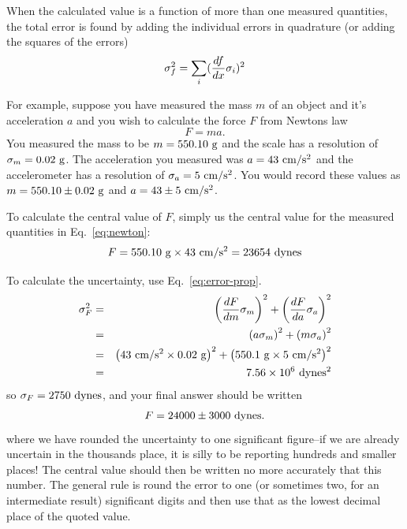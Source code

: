 \documentclass{article}
\begin{document}
When the calculated value is a function of more than one measured quantities, the total error is found by adding the individual errors in quadrature (or adding the squares of the errors)
\begin{equation}
\sigma_f^2 = \sum_i ({df \over dx} \sigma_i)^2
\label{eq:error-prop}
\end{equation}

For example, suppose you have measured the mass $m$ of an object and it's acceleration $a$ and you wish to calculate the force $F$ from Newtons law
\begin{equation}
F = ma.
\label{eq:newton}
\end{equation}
You measured the mass to be $m = 550.10~ {\rm g}$ and the scale has a resolution of $\sigma_m = 0.02 ~{\rm g}$.  The acceleration you measured was $a = 43 ~{\rm cm}/{\rm s}^2$ and the accelerometer has a resolution of $\sigma_a = 5 ~{\rm cm}/{\rm s}^2$.  You would record these values as $m = 550.10 \pm 0.02 ~{\rm g}$ and $a = 43 \pm 5 ~{\rm cm}/{\rm s}^2$.

To calculate the central value of $F$, simply us the central value for the measured quantities in Eq.~\ref{eq:newton}:
\begin{equation}
F = 550.10 ~{\rm g} \times 43~ {\rm cm}/{\rm s}^2 = 23654 ~{\rm dynes}
\end{equation}

To calculate the uncertainty, use Eq.~\ref{eq:error-prop}.
\begin{eqnarray*}
\sigma_F^2 &=& \left( {dF \over dm} \sigma_m \right)^2 + \left( {dF \over da} \sigma_a \right)^2 \\
&=& \left( a \sigma_m \right)^2 + \left( m \sigma_a \right)^2 \\
&=& \left( 43 ~{\rm cm}/{\rm s}^2\times  0.02 ~{\rm g} \right)^2 + \left( 550.1 ~{\rm g}\times  5~ {\rm cm}/{\rm s}^2\right)^2 \\
&=& 7.56\times 10^6 ~{\rm dynes^2}
\end{eqnarray*}
so $\sigma_F = 2750 ~{\rm dynes}$, and your final answer should be written
\begin{equation}
F = 24000 \pm 3000 ~{\rm dynes}.
\end{equation}
where we have rounded the uncertainty to one significant figure--if we are already uncertain in the thousands place, it is silly to be reporting hundreds and smaller places!  The central value should then be written no more accurately that this number.  The general rule is round the error to one (or sometimes two, for an intermediate result) significant digits and then use that as the lowest decimal place of the quoted value.  
\end{document}
